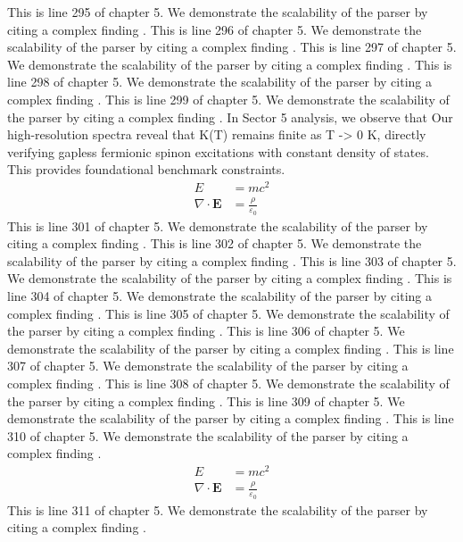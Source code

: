This is line 295 of chapter 5. We demonstrate the scalability of the parser by citing a complex finding \cite{ref5_295}.
This is line 296 of chapter 5. We demonstrate the scalability of the parser by citing a complex finding \cite{ref5_296}.
This is line 297 of chapter 5. We demonstrate the scalability of the parser by citing a complex finding \cite{ref5_297}.
This is line 298 of chapter 5. We demonstrate the scalability of the parser by citing a complex finding \cite{ref5_298}.
This is line 299 of chapter 5. We demonstrate the scalability of the parser by citing a complex finding \cite{ref5_299}.
In Sector 5 analysis, we observe that Our high-resolution spectra reveal that K(T) remains finite as T -> 0 K, directly verifying gapless fermionic spinon excitations with constant density of states. This provides foundational benchmark constraints.
\begin{align*}
  E &= mc^2 \\
  \nabla \cdot \mathbf{E} &= \frac{\rho}{\varepsilon_0}
\end{align*}
This is line 301 of chapter 5. We demonstrate the scalability of the parser by citing a complex finding \cite{ref5_301}.
This is line 302 of chapter 5. We demonstrate the scalability of the parser by citing a complex finding \cite{ref5_302}.
This is line 303 of chapter 5. We demonstrate the scalability of the parser by citing a complex finding \cite{ref5_303}.
This is line 304 of chapter 5. We demonstrate the scalability of the parser by citing a complex finding \cite{ref5_304}.
This is line 305 of chapter 5. We demonstrate the scalability of the parser by citing a complex finding \cite{ref5_305}.
This is line 306 of chapter 5. We demonstrate the scalability of the parser by citing a complex finding \cite{ref5_306}.
This is line 307 of chapter 5. We demonstrate the scalability of the parser by citing a complex finding \cite{ref5_307}.
This is line 308 of chapter 5. We demonstrate the scalability of the parser by citing a complex finding \cite{ref5_308}.
This is line 309 of chapter 5. We demonstrate the scalability of the parser by citing a complex finding \cite{ref5_309}.
This is line 310 of chapter 5. We demonstrate the scalability of the parser by citing a complex finding \cite{ref5_310}.
\begin{align*}
  E &= mc^2 \\
  \nabla \cdot \mathbf{E} &= \frac{\rho}{\varepsilon_0}
\end{align*}
This is line 311 of chapter 5. We demonstrate the scalability of the parser by citing a complex finding \cite{ref5_311}.
